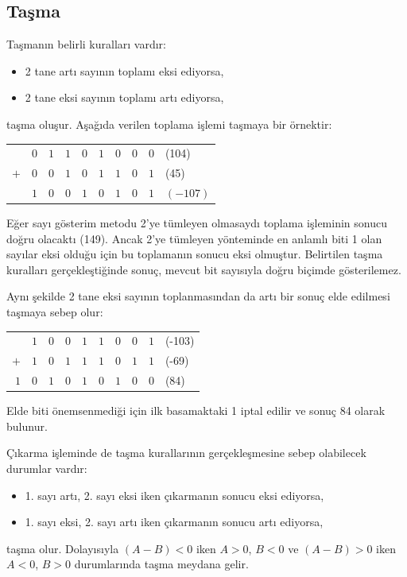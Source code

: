 \subsection{Taşma}
\label{sec:tasma}

Taşmanın belirli kuralları vardır:
\begin{itemize}
\item 2 tane artı sayının toplamı eksi ediyorsa,
\item 2 tane eksi sayının toplamı artı ediyorsa,
\end{itemize}
taşma oluşur. Aşağıda verilen toplama işlemi taşmaya bir örnektir:

\begin{center}
\begin{tabular}{r c c c c c c c c l}
  & $0$ & $1$ & $1$ & $0$ & $1$ & $0$ & $0$ & $0$ & (104) \\
$+$ & $0$ & $0$ & $1$ & $0$ & $1$ & $1$ & $0$ & $1$ & (45) \\
\hline
  & $1$ & $0$ & $0$ & $1$ & $0$ & $1$ & $0$ & $1$ & $(-107)$ \\
\end{tabular}
\end{center}

Eğer sayı gösterim metodu 2'ye tümleyen olmasaydı toplama işleminin sonucu doğru olacaktı (149). Ancak 2'ye tümleyen yönteminde en anlamlı biti 1 olan sayılar eksi olduğu için bu toplamanın sonucu eksi olmuştur. Belirtilen taşma kuralları gerçekleştiğinde sonuç, mevcut bit sayısıyla doğru biçimde gösterilemez.

Aynı şekilde 2 tane eksi sayının toplanmasından da artı bir sonuç elde edilmesi taşmaya sebep olur:

\begin{center}
\begin{tabular}{r c c c c c c c c l}
  & $1$ & $0$ & $0$ & $1$ & $1$ & $0$ & $0$ & $1$ & (-103) \\
$+$ & $1$ & $0$ & $1$ & $1$ & $1$ & $0$ & $1$ & $1$ & (-69) \\
\hline
$1$ & $0$ & $1$ & $0$ & $1$ & $0$ & $1$ & $0$ & $0$ & (84) \\
\end{tabular}
\end{center}

Elde biti önemsenmediği için ilk basamaktaki 1 iptal edilir ve sonuç 84 olarak bulunur.

Çıkarma işleminde de taşma kurallarının gerçekleşmesine sebep olabilecek durumlar vardır:
\begin{itemize}
\item 1. sayı artı, 2. sayı eksi iken çıkarmanın sonucu eksi ediyorsa,
\item 1. sayı eksi, 2. sayı artı iken çıkarmanın sonucu artı ediyorsa,
\end{itemize}
taşma olur. Dolayısıyla $(A-B)<0$ iken $A>0$, $B<0$ ve $(A-B)>0$ iken $A<0$, $B>0$ durumlarında taşma meydana gelir.

